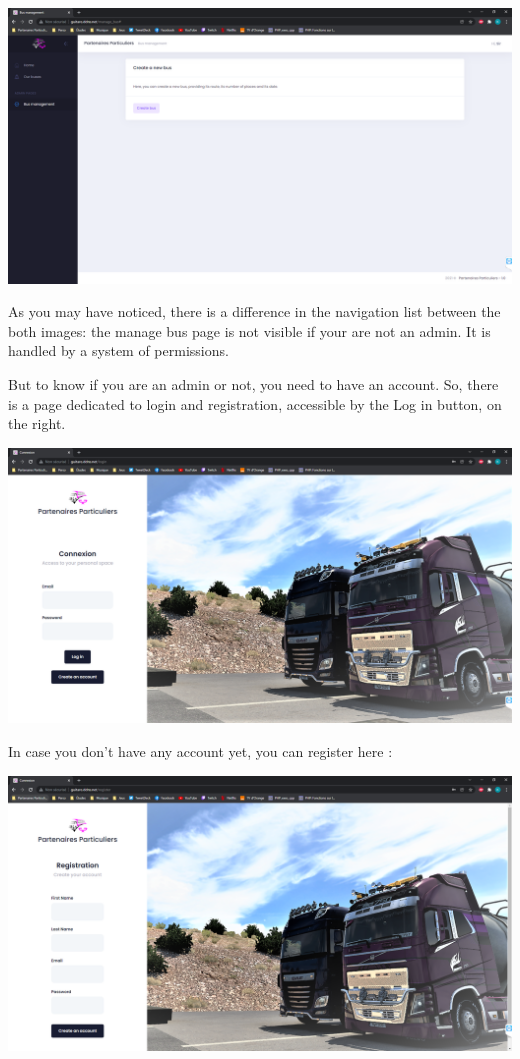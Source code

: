 \documentclass[12pt,a4paper,openany]{book}
\begin{document}
\begin{center}
	\includegraphics[scale=0.35]{Figs/fig2}
\end{center}

As you may have noticed, there is a difference in the navigation list between the both images: the manage bus page is not visible if your are not an admin. It is handled by a system of permissions.
\pagebreak

But to know if you are an admin or not, you need to have an account. So, there is a page dedicated to login and registration, accessible by the Log in button, on the right.

\begin{center}
	\includegraphics[scale=0.35]{Figs/fig3}
\end{center}

In case you don't have any account yet, you can register here :

\begin{center}
	\includegraphics[scale=0.35]{Figs/fig4}
\end{center}
\end{document}
